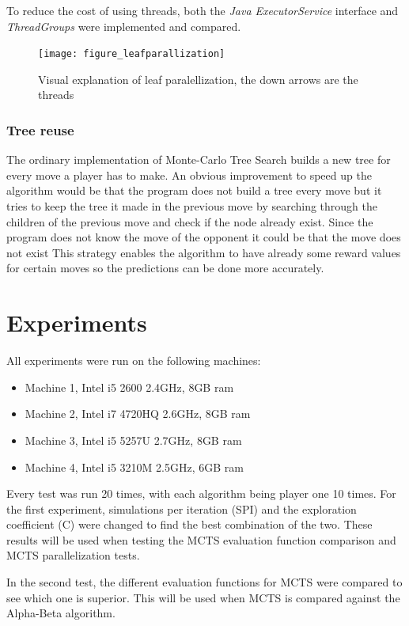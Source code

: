 \documentclass{ba-kecs}
\begin{document}
To reduce the cost of using threads, both the \textit{Java ExecutorService} interface and \textit{ThreadGroups} were implemented and compared.
\begin{figure}
	\centering
	\texttt{[image: figure\_leafparallization]}
		\caption{Visual explanation of leaf paralellization, the down arrows are the threads \cite{chaslot2008parallel}}
		\label{fig:leaf}
\end{figure}


\subsubsection{Tree reuse}
The ordinary implementation of Monte-Carlo Tree Search builds a new tree for every move a player has to make. An obvious improvement to speed up the algorithm would be that the program does not build a tree every move but it tries to keep the tree it made in the previous move by searching through the children of the previous move and check if the node already exist. Since the program does not know the move of the opponent it could be that the move does not exist This strategy enables the algorithm to have already some reward values for certain moves so the predictions can be done more accurately.

\section{Experiments}
All experiments were run on the following machines:
\begin{itemize}
	\item Machine 1, Intel i5 2600 2.4GHz, 8GB ram
	\item Machine 2, Intel i7 4720HQ 2.6GHz, 8GB ram
		\item Machine 3, Intel i5 5257U 2.7GHz, 8GB ram
	\item Machine 4, Intel i5 3210M 2.5GHz, 6GB ram
\end{itemize}
Every test was run 20 times, with each algorithm being player one 10 times. For the first experiment, simulations per iteration (SPI) and the exploration coefficient (C) were changed to find the best combination of the two. These results will be used when testing the MCTS evaluation function comparison and MCTS parallelization tests. 

In the second test, the different evaluation functions for MCTS were compared to see which one is superior. This will be used when MCTS is compared against the Alpha-Beta algorithm. 
\end{document}

